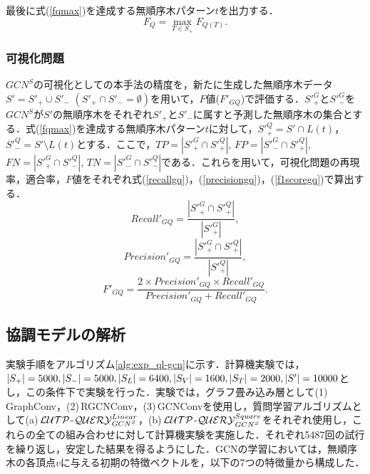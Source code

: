 \noindent
最後に式(\ref{fqmax})を達成する無順序木パターン$t$を出力する．
\begin{equation}
  \label{fqmax}
  F_Q=\max_{T\in S_+}F_{Q(T)}.
\end{equation}


\subsubsection{可視化問題}\label{subsec4.3.3}
$GCN^S$の可視化としての本手法の精度を，新たに生成した無順序木データ${S'}={S'}_+\cup {S'}_-$ $({S'}_+\cap {S'}_-=\emptyset)$を用いて，$F$値($F'_{GQ}$)で評価する．${S'}_+^G$と${S'}_-^G$を$GCN^S$が$S'$の無順序木をそれぞれ${S'}_+$と${S'}_-$に属すと予測した無順序木の集合とする．式(\ref{fqmax})を達成する無順序木パターン$t$に対して，${S'}_+^Q=S'\cap L(t)$，${S'}_-^Q=S'\setminus L(t)$とする．ここで，$TP=|{S'}_+^{G}\cap {S'}_+^{Q}|$, $FP=|{S'}_-^{G}\cap {S'}_+^{Q}|$, $FN=|{S'}_+^{G}\cap {S'}_-^{Q}|$, $TN=|{S'}_-^{G}\cap {S'}_-^{Q}|$である．これらを用いて，可視化問題の再現率，適合率，$F$値をそれぞれ式(\ref{recallgq})，(\ref{precisiongq})，(\ref{f1scoregq})で算出する．
\begin{equation}
  \label{recallgq}
  Recall'_{GQ}=\frac{|{S'}_+^G\cap {S'}_+^Q|}{|{S'}_+^G|},
\end{equation}
\begin{equation}
  \label{precisiongq}
  Precision'_{GQ}=\frac{|{S'}_+^G\cap {S'}_+^Q|}{|{S'}_+^Q|},
\end{equation}
\begin{equation}
  \label{f1scoregq}
  F'_{GQ}=\frac{2\times Precision'_{GQ}\times Recall'_{GQ}}{Precision'_{GQ}+Recall'_{GQ}}.
\end{equation}


\subsection{協調モデルの解析}
実験手順をアルゴリズム\ref{alg:exp_ql-gcn}に示す．計算機実験では，$\lvert S_+\rvert=5000, \lvert S_-\rvert=5000, \lvert S_L\rvert=6400, \lvert S_V\rvert=1600, \lvert S_T\rvert=2000, \lvert S'\rvert=10000$とし，この条件下で実験を行った．実験では，グラフ畳み込み層として(1)\,GraphConv，(2)\,RGCNConv，(3)\,GCNConvを使用し，質問学習アルゴリズムとして(a)\,${\cal LUTP}$-${\cal QUERY}_{GCN^S}^{Linear}$，(b)\,${\cal LUTP}$-${\cal QUERY}_{GCN^S}^{Square}$をそれぞれ使用し，これらの全ての組み合わせに対して計算機実験を実施した．それぞれ5487回の試行を繰り返し，安定した結果を得るようにした．GCNの学習においては，無順序木の各頂点$v$に与える初期の特徴ベクトルを，以下の7つの特徴量から構成した．

